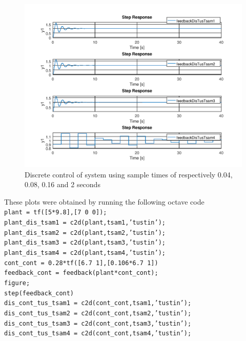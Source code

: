 \documentclass[a4paper, 12pt]{article}
\begin{document}
\begin{figure}[H]
  \centering
  \includegraphics[width=\textwidth]{img/discrete_controllers.png}
  \caption{Discrete control of system using sample times of respectively 0.04, 0.08, 0.16 and 2 seconds}
  \label{fig:discrete_controllers}
\end{figure}

These plots were obtained by running the following octave code\\

  \noindent
  \texttt{plant = tf([5*9.8],[7 0 0]);}\\
  \texttt{plant\_dis\_tsam1 = c2d(plant,tsam1,'tustin');}\\
  \texttt{plant\_dis\_tsam2 = c2d(plant,tsam2,'tustin');}\\
  \texttt{plant\_dis\_tsam3 = c2d(plant,tsam3,'tustin');}\\
  \texttt{plant\_dis\_tsam4 = c2d(plant,tsam4,'tustin');}\\

  \noindent
  \texttt{cont\_cont = 0.28*tf([6.7 1],[0.106*6.7 1])}\\
  
  \noindent
  \texttt{feedback\_cont = feedback(plant*cont\_cont);}\\
  \texttt{figure;}\\
  \texttt{step(feedback\_cont)}\\
  
  \noindent
  \texttt{dis\_cont\_tus\_tsam1 = c2d(cont\_cont,tsam1,'tustin');}\\
  \texttt{dis\_cont\_tus\_tsam2 = c2d(cont\_cont,tsam2,'tustin');}\\
  \texttt{dis\_cont\_tus\_tsam3 = c2d(cont\_cont,tsam3,'tustin');}\\
  \texttt{dis\_cont\_tus\_tsam4 = c2d(cont\_cont,tsam4,'tustin');}\\
  
\end{document}
